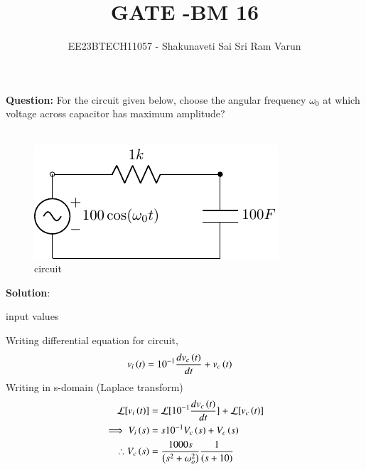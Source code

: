 \documentclass[journal,12pt,twocolumn]{IEEEtran}
\theoremstyle{remark}
\begin{document}

\vspace{3cm}

\title{GATE -BM 16}
\author{EE23BTECH11057 - Shakunaveti Sai Sri Ram Varun$^{}$%
}
\maketitle
\newpage
\bigskip
\vspace{2cm}
\textbf{Question: }
For the circuit given below, choose the angular frequency $ \omega_0$ at which voltage across capacitor has maximum amplitude?\\\\
\begin{figure}[h!]
    \includegraphics[width = \columnwidth]{codes/fig1/c_fig1.pdf}
    \caption{circuit }
    \centering
    \label{fig: bm_16_fig_1}
\end{figure}
\textbf{Solution}:\\
\begin{table}[htbp] 
\centering

\caption{input values}
\label{tab: table-bm16}
\end{table}
Writing differential equation for circuit,
\begin{align}
v_i\left(t\right) &= 10^{-1}\frac{dv_c\left(t\right)}{dt} + v_c\left(t\right)
\end{align}
Writing in s-domain (Laplace transform)
\begin{align}
\mathcal{L}[v_i\left(t\right)] &= \mathcal{L}[10^{-1}\frac{dv_c\left(t\right)}{dt}] + \mathcal{L}[v_c\left(t\right)]\\
\implies V_i\left(s\right) &= s10^{-1}V_c\left(s\right) + V_c\left(s\right)\\
\therefore V_c\left(s\right) &= \frac{1000s}{\left(s^2+ \omega_o^2\right)}\frac{1}{(s+10)}
\end{align}
\end{document}
